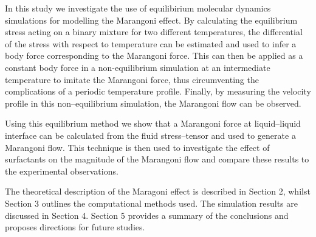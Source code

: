 In this study we investigate the use of equilibirium molecular dynamics simulations for modelling the Marangoni effect.
By calculating the equilibrium stress acting on a binary mixture for two different temperatures, the differential of the stress with respect to temperature can be estimated and used to infer a body force corresponding to the Marangoni force.
This can then be applied as a constant body force in a non-equilibrium simulation at an intermediate temperature to imitate the Marangoni force, thus circumventing the complications of a periodic temperature profile.
Finally, by measuring the velocity profile in this non--equilibrium simulation, the Marangoni flow can be observed.

Using this equilibrium method we show that a Marangoni force at liquid--liquid interface can be calculated from the fluid stress--tensor and used to generate a Marangoni flow.
This technique is then used to investigate the effect of surfactants on the magnitude of the Marangoni flow and compare these results to the experimental observations.

The theoretical description of the Maragoni effect is described in Section 2, whilst Section 3 outlines the computational methods used.
The simulation results are discussed in Section 4.
Section 5 provides a summary of the conclusions and proposes directions for future studies.
